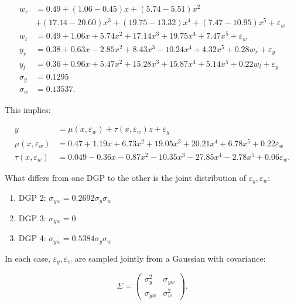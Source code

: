 \documentclass[11pt]{article}
\begin{document}
\begin{equation}
  \begin{split}
    w_r &= 0.49 + (1.06-0.45) x + (5.74-5.51) x^2 \\
    &+ (17.14-20.60) x^3 + (19.75-13.32) x^4 + (7.47-10.95) x^5 + \varepsilon_w\\
    w_l &= 0.49 + 1.06 x + 5.74 x^2 + 17.14 x^3 + 19.75 x^4 + 7.47 x^5 + \varepsilon_w\\
    y_r &= 0.38 + 0.63 x - 2.85 x^2 + 8.43 x^3 - 10.24 x^4 + 4.32 x^5 + 0.28 w_r + \varepsilon_y\\
    y_l &= 0.36 + 0.96 x + 5.47 x^2 + 15.28 x^3 + 15.87 x^4 + 5.14 x^5 + 0.22 w_l + \varepsilon_y\\
    \sigma_y &= 0.1295\\
    \sigma_w &= 0.13537.
  \end{split}
\end{equation}

This implies:

\begin{equation}
  \begin{split}
    y &= \mu(x,\varepsilon_w) + \tau(x,\varepsilon_w)z + \varepsilon_y\\
    \mu(x,\varepsilon_w) &= 0.47 + 1.19 x + 6.73 x^2 + 19.05 x^3 + 20.21 x^4 + 6.78 x^5 + 0.22 \varepsilon_w\\
    \tau(x,\varepsilon_w) &= 0.049 - 0.36 x - 0.87 x^2 - 10.35 x^3 - 27.85 x^4 - 2.78 x^5 + 0.06 \varepsilon_w.
  \end{split}
\end{equation}

What differs from one DGP to the other is the joint
distribution of \(\varepsilon_y,\varepsilon_w\):

\begin{enumerate}
\item DGP 2: \(\sigma_{yw} = 0.2692 \sigma_y \sigma_w\)
\item DGP 3: \(\sigma_{yw} = 0\)
\item DGP 4: \(\sigma_{yw} = 0.5384 \sigma_y \sigma_w\)
\end{enumerate}

In each case, \(\varepsilon_y,\varepsilon_w\) are sampled
jointly from a Gaussian with covariance:

\begin{equation}
  \Sigma = \begin{pmatrix}
    \sigma_y^2 & \sigma_{yw}\\
    \sigma_{yw} & \sigma_w^2
  \end{pmatrix}.
\end{equation}
\end{document}
